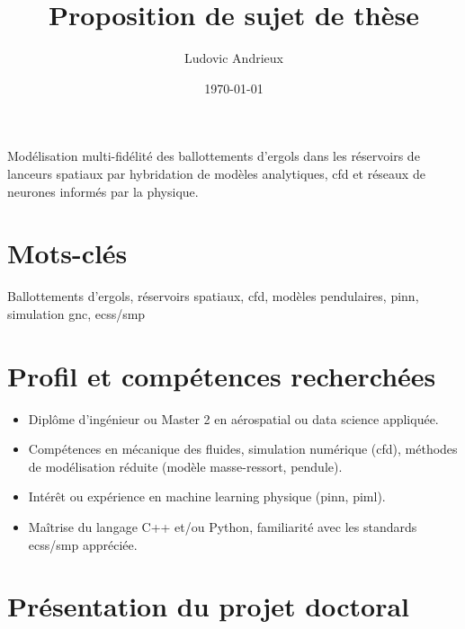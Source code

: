 \documentclass[12pt]{article}
\title{Proposition de sujet de thèse}
\author{Ludovic Andrieux}
\date{\today}
\begin{document}
	\maketitle
	
	\begin{tcolorbox}[colback=gray!0, colframe=black, sharp corners, boxrule=0.5pt]
	Modélisation multi-fidélité des ballottements d’ergols dans les réservoirs de lanceurs spatiaux par hybridation de modèles analytiques, \acrshort{cfd} et réseaux de neurones informés par la physique.
	\end{tcolorbox}
	
	\section*{Mots-clés}
	
	Ballottements d'ergols, réservoirs spatiaux, \acrshort{cfd}, modèles pendulaires, \acrshort{pinn}, simulation \acrshort{gnc}, \acrshort{ecss}/\acrshort{smp}
	
	\section*{Profil et compétences recherchées}
	
	\begin{itemize}
		\item Diplôme d’ingénieur ou Master 2 en aérospatial ou data science appliquée.
		
		\item Compétences en mécanique des fluides, simulation numérique (\acrshort{cfd}), méthodes de modélisation réduite (modèle masse-ressort, pendule).
		
		\item Intérêt ou expérience en machine learning physique (\acrshort{pinn}, \acrshort{piml}).
		
		\item Maîtrise du langage C++ et/ou Python, familiarité avec les standards \acrshort{ecss}/\acrshort{smp} appréciée.
	\end{itemize}
	
	
	\section*{Présentation du projet doctoral}
	
\end{document}
